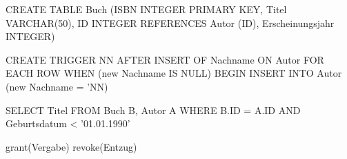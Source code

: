 \begin{aufgabe}%
	\begin{teile}
	\item
	\begin{sql}
	CREATE TABLE Buch
	(ISBN INTEGER PRIMARY KEY,
	Titel VARCHAR(50),
	ID INTEGER REFERENCES Autor (ID),
	Erscheinungsjahr INTEGER)
	\end{sql}
	\item
	\begin{sql}
	CREATE TRIGGER NN
	AFTER INSERT OF Nachname ON Autor
	FOR EACH ROW
	WHEN (new Nachname IS NULL)
	BEGIN
	INSERT INTO Autor (new Nachname = 'NN)
	\end{sql}
	\item
	\begin{sql}
	SELECT Titel
	FROM Buch B, Autor A
	WHERE B.ID = A.ID
	AND Geburtsdatum < '01.01.1990'
	\end{sql}
	\item
	\item
	\item
	\item
	\begin{sql}
	grant(Vergabe)
	revoke(Entzug)
	\end{sql}
	\end{teile}
\end{aufgabe}

\begin{aufgabe}%

\end{aufgabe}

\begin{aufgabe}%
\begin{teile}
	\item 
	\item
\end{teile}
\end{aufgabe}

